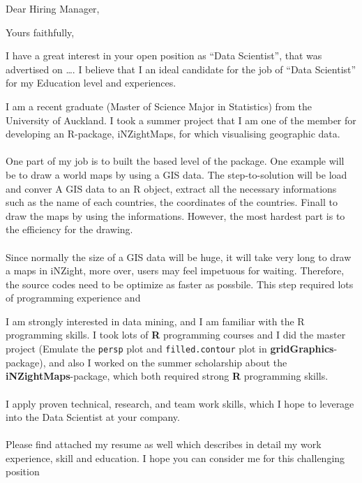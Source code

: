 \documentclass[12pt,a4paper,sans]{moderncv}        %
\title{}                               %
\begin{document}
	\date{19/07/2017}
	\opening{Dear Hiring Manager,}
	\closing{Yours faithfully,}
	\makelettertitle
	
	I have a great interest in your open position as “Data Scientist”, that was advertised on …. I believe that I an ideal candidate for the job of “Data Scientist” for my Education level and experiences.
	
	I am a recent graduate (Master of Science Major in Statistics) from the University of Auckland. I took a summer project that I am one of the member for developing an R-package, iNZightMaps, for which visualising geographic data. \\~\\
	One part of my job is to built the based level of the package. One example will be to draw a world maps by using a GIS data. The step-to-solution will be load and conver A GIS data to an R object, extract all the necessary informations such as the name of each countries, the coordinates of the countries. Finall to draw the maps by using the informations. However, the most hardest part is to the efficiency for the drawing. \\~\\
	Since normally the size of a GIS data will be huge, it will take very long to draw a maps in iNZight, more over, users may feel impetuous for waiting. Therefore, the source codes need to be optimize as faster as possbile. This step required lots of programming experience and 
	
	 I am strongly interested in data mining, and I am familiar with the R programming skills. I took lots of \textbf{R} programming courses and I did the master project (Emulate the \texttt{persp} plot and \texttt{filled.contour} plot in  \textbf{gridGraphics}-package), and also I worked on the summer scholarship about the \textbf{iNZightMaps}-package, which both required strong \textbf{R} programming skills. 
	\\~\\
	I apply proven technical, research, and team work skills, which I hope to leverage into the Data Scientist at your company. \\~\\
	
	Please find attached my resume as well which describes in detail my work experience, skill and education. I hope you can consider me for this challenging position
	
	
	\makeletterclosing
	
\end{document}
